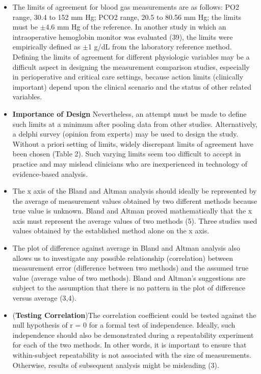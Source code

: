 \documentclass[]{article}
\begin{document}
\begin{itemize}
		\item 
		The limits of agreement for blood gas measurements are as follows: PO2 range, 30.4 to 152 mm Hg; PCO2 range, 20.5 to 80.56 mm Hg; the limits must be $\pm$4.6 mm Hg of the reference. In another study in which an intraoperative hemoglobin monitor was evaluated (39), the limits were empirically defined as $\pm$1 g/dL from the laboratory reference method. Defining the limits of agreement for different physiologic variables may be a difficult aspect in designing the measurement comparison studies, especially in perioperative and critical care settings, because action limits (clinically important) depend upon the clinical scenario and the status of other related variables. 
		\item \textbf{Importance of Design}
		Nevertheless, an attempt must be made to define such limits at a minimum after pooling data from other studies. Alternatively, a delphi survey (opinion from experts) may be used to design the study. Without a priori setting of limits, widely discrepant limits of agreement have been chosen (Table 2). Such varying limits seem too difficult to accept in practice and may mislead clinicians who are inexperienced in technology of evidence-based analysis.
		\item The x axis of the Bland and Altman analysis should ideally be represented by the average of measurement values obtained by two different methods because true value is unknown. Bland and Altman proved mathematically that the x axis must represent the average values of two methods (5). Three studies used values obtained by the established method alone on the x axis.
		\item The plot of difference against average in Bland and Altman analysis also allows us to investigate any possible relationship (correlation) between measurement error (difference between two methods) and the assumed true value (average value of two methods). 
		Bland and Altman’s suggestions are subject to the assumption that there is no pattern in the plot of difference versus average (3,4). 
		\item (\textbf{Testing Correlation})The correlation coefficient could be tested against the null hypothesis of r = 0 for a formal test of independence. Ideally, such independence should also be demonstrated during a repeatability experiment for each of the two methods. In other words, it is important to ensure that within-subject repeatability is not associated with the size of measurements. Otherwise, results of subsequent analysis might be misleading (3).
	\end{itemize}
	
\end{document}
